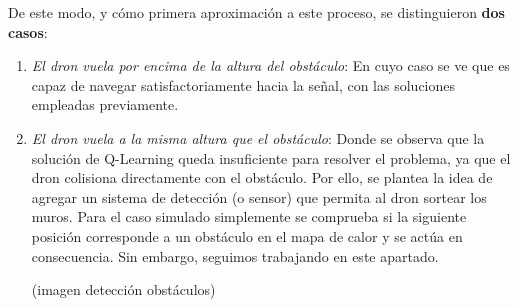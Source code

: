 De este modo, y cómo primera aproximación a este proceso, se distinguieron \textbf{dos casos}:

\begin{enumerate}
    \item \emph{El dron vuela por encima de la altura del obstáculo}: En cuyo caso se ve que es capaz de navegar satisfactoriamente hacia la señal, con las soluciones empleadas previamente.

    \item \emph{El dron vuela a la misma altura que el obstáculo}: Donde se observa que la solución de Q-Learning queda insuficiente para resolver el problema, ya que el dron colisiona directamente con el obstáculo. Por ello, se plantea la idea de agregar un sistema de detección (o sensor) que permita al dron sortear los muros. Para el caso simulado simplemente se comprueba si la siguiente posición corresponde a un obstáculo en el mapa de calor y se actúa en consecuencia. Sin embargo, seguimos trabajando en este apartado.
    
    (imagen detección obstáculos)
\end{enumerate}
